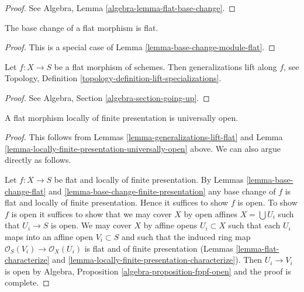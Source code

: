 \begin{proof}
See Algebra, Lemma \ref{algebra-lemma-flat-base-change}.
\end{proof}

\begin{lemma}
\label{lemma-base-change-flat}
The base change of a flat morphism is flat.
\end{lemma}

\begin{proof}
This is a special case of Lemma \ref{lemma-base-change-module-flat}.
\end{proof}

\begin{lemma}
\label{lemma-generalizations-lift-flat}
Let $f : X \to S$ be a flat morphism of schemes.
Then generalizations lift along $f$, see
Topology, Definition \ref{topology-definition-lift-specializations}.
\end{lemma}

\begin{proof}
See Algebra, Section \ref{algebra-section-going-up}.
\end{proof}

\begin{lemma}
\label{lemma-fppf-open}
A flat morphism locally of finite presentation is universally open.
\end{lemma}

\begin{proof}
This follows from Lemmas \ref{lemma-generalizations-lift-flat} and
Lemma \ref{lemma-locally-finite-presentation-universally-open} above.
We can also argue directly as follows.

\medskip\noindent
Let $f : X \to S$ be flat and locally of finite presentation.
By Lemmas \ref{lemma-base-change-flat} and
\ref{lemma-base-change-finite-presentation} any base change of $f$ is flat
and locally of finite presentation. Hence it suffices to show $f$ is open.
To show $f$ is open it suffices to show that we may cover
$X$ by open affines $X = \bigcup U_i$ such that $U_i \to S$
is open. We may cover $X$ by affine opens $U_i \subset X$ such that each
$U_i$ maps into an affine open $V_i \subset S$ and such that
the induced ring map $\mathcal{O}_S(V_i) \to \mathcal{O}_X(U_i)$ is
flat and of finite presentation (Lemmas \ref{lemma-flat-characterize} and
\ref{lemma-locally-finite-presentation-characterize}).
Then $U_i \to V_i$ is open by
Algebra, Proposition \ref{algebra-proposition-fppf-open}
and the proof is complete.
\end{proof}

